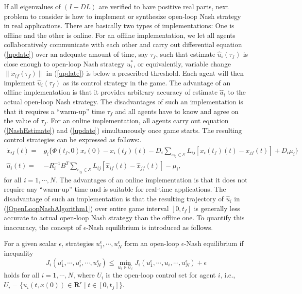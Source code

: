 \documentclass[12pt,draftcls,onecolumn]{IEEEtran}  %
\begin{document}
If all eigenvalues of $(I+DL)$ are verified to have positive real parts, next problem to consider is how to implement or synthesize open-loop Nash strategy in real applications. There are basically two types of implementations: One is offline and the other is online. For an offline implementation, we let all agents collaboratively communicate with each other and carry out differential equation (\ref{update}) over an adequate amount of time, say $\tau_f$, such that estimate $\hat{u}_i(\tau_f)$ is close enough to open-loop Nash strategy $u_i^*$, or equivalently, variable change $\|\dot{x}_{if}(\tau_f)\|$ in (\ref{update}) is below a prescribed threshold. Each agent will then implement $\hat{u}_i(\tau_f)$ as its control strategy in the game. The advantage of an offline implementation is that it provides arbitrary accuracy of estimate $\hat{u}_i$ to the actual open-loop Nash strategy. The disadvantages of such an implementation is that it requires a ``warm-up'' time $\tau_f$ and all agents have to know and agree on the value of $\tau_f$. For an online implementation, all agents carry out equation (\ref{NashEstimate}) and (\ref{update}) simultaneously once game starts. The resulting control strategies can be expressed as follows:.
\begin{subequations}\label{OpenLoopNashAlgorithm}
\begin{align}
\dot{x}_{if}(t)=&g_i\{\Phi(t_f,0)x_i(0)-x_i(t_f)(t)-D_i\sum_{e_{ij}\in\mathcal{E}}L_{ij}[x_i(t_f)(t)-x_{jf}(t)]+D_i\mu_i\} \label{OpenLoopNashAlgorithm2}\\
\hat{u}_i(t) =&-R_i^{-1}B^T\sum_{e_{ij}\in\mathcal{E}}L_{ij}[\hat{x}_{if}(t)-\hat{x}_{jf}(t)]-\mu_i,\label{OpenLoopNashAlgorithm1}
\end{align}
\end{subequations}
for all $i=1,\cdots,N$. The advantages of an online implementation is that it does not require any ``warm-up'' time and is suitable for real-time applications. The disadvantage of such an implementation is that the resulting trajectory of $\hat{u}_i$ in (\ref{OpenLoopNashAlgorithm1}) over entire game interval $[0,t_f]$ is generally less accurate to actual open-loop Nash strategy than the offline one. To quantify this inaccuracy, the concept of $\epsilon$-Nash equilibrium is introduced as follows. 
\begin{Def}
For a given scalar $\epsilon$, strategies $u^{\epsilon}_{1},\cdots,u^{\epsilon}_N$ form an open-loop $\epsilon$-Nash equilibrium if inequality
\begin{equation}
J_{i}(u_1^{\epsilon},\cdots,u^{\epsilon}_i,\cdots,u^{\epsilon}_N)\leq \min_{u_i\in U_i}J_{i}(u_1^{\epsilon},\cdots,u_i,\cdots,u^{\epsilon}_N)+\epsilon\label{epsilon1Nashinequality}
\end{equation}
holds for all $i=1,\cdots,N$, where $U_i$ is the open-loop control set for agent $i$, i.e., $U_i=\{u_i(t,x(0))\in \mathbf{R}^r \mid t\in[0,t_f]\}$.
\end{Def}
\end{document}
